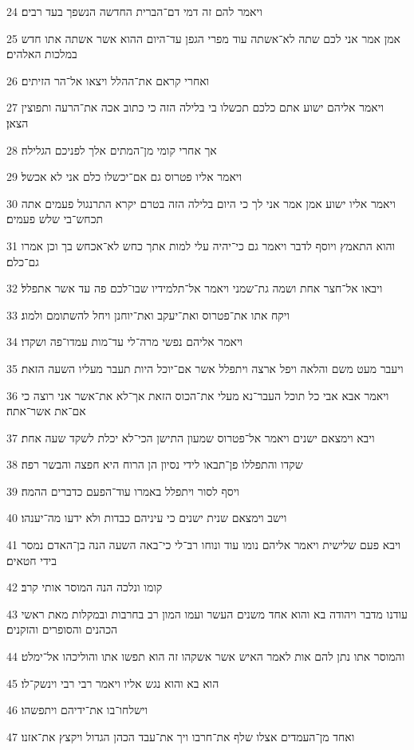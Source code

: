 \par 24 ויאמר להם זה דמי דם־הברית החדשה הנשפך בעד רבים׃
\par 25 אמן אמר אני לכם שתה לא־אשתה עוד מפרי הגפן עד־היום ההוא אשר אשתה אתו חדש במלכות האלהים׃
\par 26 ואחרי קראם את־ההלל ויצאו אל־הר הזיתים׃
\par 27 ויאמר אליהם ישוע אתם כלכם תכשלו בי בלילה הזה כי כתוב אכה את־הרעה ותפוצין הצאן׃
\par 28 אך אחרי קומי מן־המתים אלך לפניכם הגלילה׃
\par 29 ויאמר אליו פטרוס גם אם־יכשלו כלם אני לא אכשל׃
\par 30 ויאמר אליו ישוע אמן אמר אני לך כי היום בלילה הזה בטרם יקרא התרנגול פעמים אתה תכחש־בי שלש פעמים׃
\par 31 והוא התאמץ ויוסף לדבר ויאמר גם כי־יהיה עלי למות אתך כחש לא־אכחש בך וכן אמרו גם־כלם׃
\par 32 ויבאו אל־חצר אחת ושמה גת־שמני ויאמר אל־תלמידיו שבו־לכם פה עד אשר אתפלל׃
\par 33 ויקח אתו את־פטרוס ואת־יעקב ואת־יוחנן ויחל להשתומם ולמוג׃
\par 34 ויאמר אליהם נפשי מרה־לי עד־מות עמדו־פה ושקדו׃
\par 35 ויעבר מעט משם והלאה ויפל ארצה ויתפלל אשר אם־יוכל היות תעבר מעליו השעה הזאת׃
\par 36 ויאמר אבא אבי כל תוכל העבר־נא מעלי את־הכוס הזאת אך־לא את־אשר אני רוצה כי אם־את אשר־אתה׃
\par 37 ויבא וימצאם ישנים ויאמר אל־פטרוס שמעון התישן הכי־לא יכלת לשקד שעה אחת׃
\par 38 שקדו והתפללו פן־תבאו לידי נסיון הן הרוח היא חפצה והבשר רפה׃
\par 39 ויסף לסור ויתפלל באמרו עוד־הפעם כדברים ההמה׃
\par 40 וישב וימצאם שנית ישנים כי עיניהם כבדות ולא ידעו מה־יענהו׃
\par 41 ויבא פעם שלישית ויאמר אליהם נומו עוד ונוחו רב־לי כי־באה השעה הנה בן־האדם נמסר בידי חטאים׃
\par 42 קומו ונלכה הנה המוסר אותי קרב׃
\par 43 עודנו מדבר ויהודה בא והוא אחד משנים העשר ועמו המון רב בחרבות ובמקלות מאת ראשי הכהנים והסופרים והזקנים׃
\par 44 והמוסר אתו נתן להם אות לאמר האיש אשר אשקהו זה הוא תפשו אתו והוליכהו אל־ימלט׃
\par 45 הוא בא והוא נגש אליו ויאמר רבי רבי וינשק־לו׃
\par 46 וישלחו־בו את־ידיהם ויתפשהו׃
\par 47 ואחד מן־העמדים אצלו שלף את־חרבו ויך את־עבד הכהן הגדול ויקצץ את־אזנו׃
